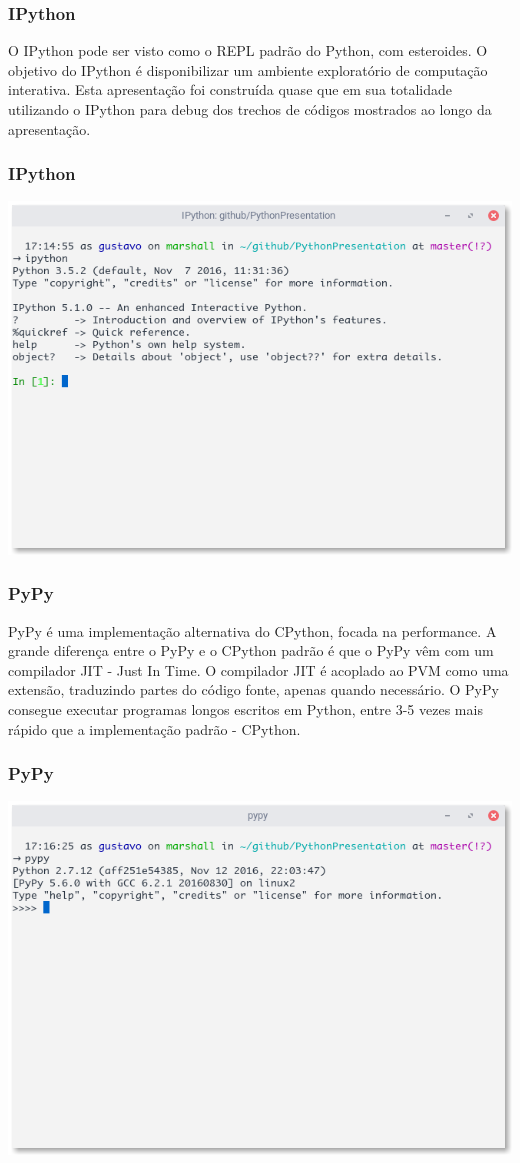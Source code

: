 \documentclass[aspectratio=169]{beamer}
\begin{document}
\begin{frame}
    \frametitle{IPython}
    O IPython pode ser visto como o REPL padrão do Python, com esteroides. O objetivo do IPython é
disponibilizar um ambiente exploratório de computação interativa.
    Esta apresentação foi construída quase que em sua totalidade utilizando o IPython para
debug dos trechos de códigos mostrados ao longo da apresentação.
\end{frame}

\begin{frame}[fragile]
    \frametitle{IPython}
	\includegraphics[scale=0.45]{python_imgs/console_ipython}
\end{frame}

\begin{frame}
    \frametitle{PyPy}
    PyPy é uma implementação alternativa do CPython, focada na performance. A grande diferença
entre o PyPy e o CPython padrão é que o PyPy vêm com um compilador JIT - Just In Time. O
compilador JIT é acoplado ao PVM como uma extensão, traduzindo partes do código fonte, apenas
quando necessário. O PyPy consegue executar programas longos escritos em Python, entre 3-5 vezes
mais rápido que a implementação padrão - CPython.
\end{frame}

\begin{frame}[fragile]
    \frametitle{PyPy}
	\includegraphics[scale=0.45]{python_imgs/console_pypy}
\end{frame}
\end{document}
